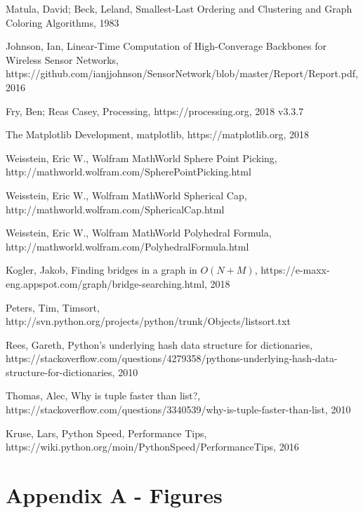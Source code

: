 \documentclass{article}
\begin{document}
\begin{thebibliography}{10}
    Matula, David; Beck, Leland, Smallest-Last Ordering and Clustering and Graph Coloring Algorithms, 1983

    Johnson, Ian, Linear-Time Computation of High-Converage Backbones for Wireless Sensor Networks, https://github.com/ianjjohnson/SensorNetwork/blob/master/Report/Report.pdf, 2016

    Fry, Ben; Reas Casey, Processing, https://processing.org, 2018 v3.3.7

    The Matplotlib Development, matplotlib, https://matplotlib.org, 2018

    Weisstein, Eric W., Wolfram MathWorld Sphere Point Picking, http://mathworld.wolfram.com/SpherePointPicking.html

    Weisstein, Eric W., Wolfram MathWorld Spherical Cap, http://mathworld.wolfram.com/SphericalCap.html

    Weisstein, Eric W., Wolfram MathWorld Polyhedral Formula, http://mathworld.wolfram.com/PolyhedralFormula.html

    Kogler, Jakob, Finding bridges in a graph in $O(N + M)$, https://e-maxx-eng.appspot.com/graph/bridge-searching.html, 2018

    Peters, Tim, Timsort, http://svn.python.org/projects/python/trunk/Objects/listsort.txt

    Rees, Gareth, Python's underlying hash data structure for dictionaries, https://stackoverflow.com/questions/4279358/pythons-underlying-hash-data-structure-for-dictionaries, 2010

    Thomas, Alec, Why is tuple faster than list?, https://stackoverflow.com/questions/3340539/why-is-tuple-faster-than-list, 2010

    Kruse, Lars, Python Speed, Performance Tips, https://wiki.python.org/moin/PythonSpeed/PerformanceTips, 2016

\end{thebibliography}

\newpage

\section{Appendix A - Figures}
\end{document}

